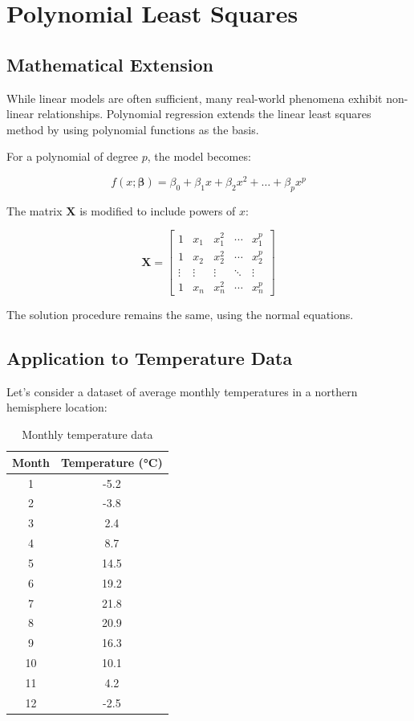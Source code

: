 \documentclass[12pt]{article}
\begin{document}
\section{Polynomial Least Squares}

\subsection{Mathematical Extension}

While linear models are often sufficient, many real-world phenomena exhibit non-linear relationships. Polynomial regression extends the linear least squares method by using polynomial functions as the basis.

For a polynomial of degree $p$, the model becomes:

\begin{equation}
f(x; \boldsymbol{\beta}) = \beta_0 + \beta_1 x + \beta_2 x^2 + \ldots + \beta_p x^p
\end{equation}

The matrix $\mathbf{X}$ is modified to include powers of $x$:

\begin{equation}
\mathbf{X} = \begin{bmatrix} 
1 & x_1 & x_1^2 & \cdots & x_1^p \\
1 & x_2 & x_2^2 & \cdots & x_2^p \\
\vdots & \vdots & \vdots & \ddots & \vdots \\
1 & x_n & x_n^2 & \cdots & x_n^p
\end{bmatrix}
\end{equation}

The solution procedure remains the same, using the normal equations.

\subsection{Application to Temperature Data}

Let's consider a dataset of average monthly temperatures in a northern hemisphere location:

\begin{table}[H]
\centering
\begin{tabular}{cc}
\toprule
Month & Temperature (°C) \\
\midrule
1 & -5.2 \\
2 & -3.8 \\
3 & 2.4 \\
4 & 8.7 \\
5 & 14.5 \\
6 & 19.2 \\
7 & 21.8 \\
8 & 20.9 \\
9 & 16.3 \\
10 & 10.1 \\
11 & 4.2 \\
12 & -2.5 \\
\bottomrule
\end{tabular}
\caption{Monthly temperature data}
\label{tab:temperature_data}
\end{table}
\end{document}
